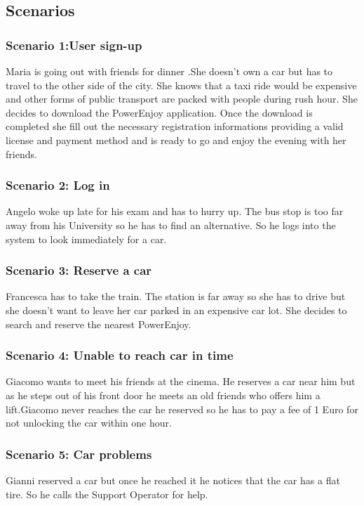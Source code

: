 \documentclass[12pt]{article}
\begin{document}
 	 	
 	 	
 	 	\subsection{Scenarios}
 		
 	 	
 	 	\subsubsection{Scenario 1:User sign-up}
 	 	Maria is going out with friends for dinner .She doesn't own a 
 	 	car but has to travel to the other side of the city. She knows that a taxi ride  
 	 	would be expensive and other forms of public transport are packed with people during
 	 	rush hour. She decides to download the PowerEnjoy application. Once the download is 
 	 	completed she fill out the necessary registration informations providing a valid 
 	 	license and payment method and is ready to go and enjoy the evening with her friends.

		\subsubsection{Scenario 2: Log in}
		Angelo woke up late for his exam and has to hurry up. The bus stop is too far away 
		from his University so he has to find an alternative. So he logs into the system to
		look immediately for a car.
		
		\subsubsection{Scenario 3: Reserve a car}
		Francesca has to take the train. The station is far away so she has to drive but she
		doesn't want to leave her car parked in an expensive car lot. She decides to search 
		and reserve the nearest PowerEnjoy.
		 
		\subsubsection{Scenario 4: Unable to reach car in time}
		Giacomo wants to meet his friends at the cinema. He reserves a car near him but as he 
		steps out of his front door he meets an old friends who offers him a lift.Giacomo
		never reaches the car he reserved so he has to pay a fee of 1 Euro for not unlocking
		the car within one hour.
		
		\subsubsection{Scenario 5: Car problems}
		Gianni reserved a car but once he reached it he notices that the car has a flat
		tire. So he calls the Support Operator for help.
		
\end{document}
